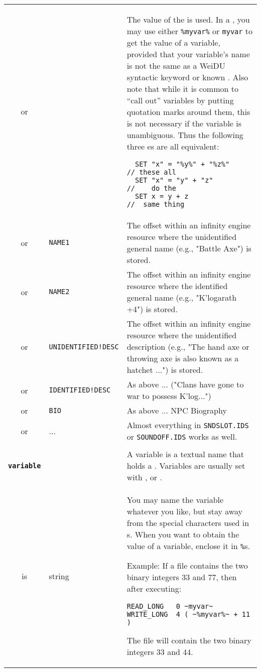 \documentclass{article}
\def\ttref#1{\ahrefloc{#1}{\tt #1}}
\def\DEFINE#1{{\tt \bf #1}\label{#1}\index{#1}}
\def\t#1{{\tt #1}}
\begin{document}
\begin{tabular}{cp{10in}|p{10in}}
or & \ttref{variable} &
    The value of the \ttref{variable} is used.
  In a \ttref{patch} \ttref{value}, you may use either \t{\%myvar\%} or
  \t{myvar} to get the value of a variable, provided that your variable's
  name is not the same as a WeiDU syntactic keyword or known
  \ttref{constant}. Also note that while it is common to ``call out''
  variables by putting quotation marks around them, this is not necessary
  if the variable is unambiguous. Thus the following three \ttref{patch}es
  are all equivalent:
\begin{verbatim}
  SET "x" = "%y%" + "%z%"       // these all
  SET "x" = "y" + "z"           //    do the
  SET x = y + z                 //  same thing
\end{verbatim} \\

or & \t{NAME1}   & The offset within an infinity engine resource where the unidentified general name (e.g., "Battle Axe") is stored. \\
or & \t{NAME2}   & The offset within an infinity engine resource where the identified general name (e.g., "K'logarath +4") is stored. \\
or & \t{UNIDENTIFIED!DESC}  & The offset within an infinity engine resource where the unidentified description (e.g., "The hand axe or throwing axe is also known as a hatchet ...") is stored. \\
or & \t{IDENTIFIED!DESC}    & As above ... ("Clans have gone to war to possess K'log...")\\
or & \t{BIO}                & As above ... NPC Biography\\
or & ...        & Almost everything in \t{SNDSLOT.IDS} or \t{SOUNDOFF.IDS}
works as well. \\

\\

\DEFINE{variable} & & A variable is a textual name that holds a
\ttref{value}. Variables are usually set with \ttref{READ!BYTE},
\ttref{SET} or \ttref{SPRINT}. \\
is & string & You may name the variable whatever you like, but stay
away from the special characters used in \ttref{regexp}s. When you want to
obtain the value of a variable, enclose it in \t{\%}s.


Example: If a file contains the two binary integers 33 and 77, then after
executing:

\begin{verbatim}
READ_LONG   0 ~myvar~
WRITE_LONG  4 ( ~%myvar%~ + 11 )
\end{verbatim}

The file will contain the two binary integers 33 and 44. \\

\end{tabular}
\end{document}

